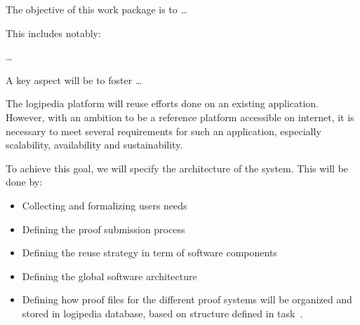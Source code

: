 \begin{workpackage}[id=access,wphases=0-48,type=MGT,
  short=Access,%
  title={Access to the infrastructure},
  lead=Inr,
  InrRM=28,
  OcaRM=6]

\begin{wpobjectives}
  The objective of this work package is to \ldots

This includes notably:
  \begin{compactitem}
  \item \ldots
  \end{compactitem}
  A key aspect will be to foster \ldots
\end{wpobjectives}

\begin{wpdescription}

\end{wpdescription}

\begin{tasklist}

\begin{task}[id=archi,title=Defining the functional and software architecture,lead=Irt]
    The logipedia platform will reuse efforts done on an existing application. However,
    with an ambition to be a reference platform accessible on internet, it is necessary
    to meet several requirements for such an application, especially scalability, 
    availability and sustainability.

    To achieve this goal, we will specify the architecture of the system.
    This will be done by:
    \begin{itemize}
        \item Collecting and formalizing users needs
        \item Defining the proof submission process
        \item Defining the reuse strategy in term of software components
        \item Defining the global software architecture
        \item Defining how proof files for the different proof systems will be organized 
            and stored in logipedia database, based on structure defined in task~.
    \end{itemize}


\end{task}
\end{tasklist}
\end{workpackage}
